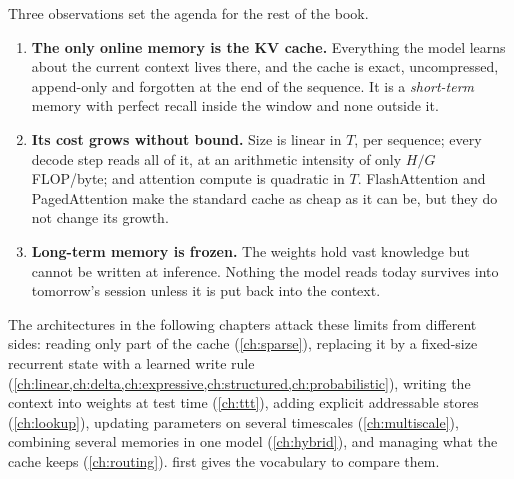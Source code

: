Three observations set the agenda for the rest of the book.
\begin{enumerate}
  \item \textbf{The only online memory is the KV cache.} Everything the model learns about
  the current context lives there, and the cache is exact, uncompressed, append-only and
  forgotten at the end of the sequence. It is a \emph{short-term} memory with perfect recall
  inside the window and none outside it.
  \item \textbf{Its cost grows without bound.} Size is linear in $T$, per sequence; every
  decode step reads all of it, at an arithmetic intensity of only $H/G$ FLOP/byte; and
  attention compute is quadratic in $T$. FlashAttention and PagedAttention make the standard
  cache as cheap as it can be, but they do not change its growth.
  \item \textbf{Long-term memory is frozen.} The weights hold vast knowledge but cannot be
  written at inference. Nothing the model reads today survives into tomorrow's session unless
  it is put back into the context.
\end{enumerate}
The architectures in the following chapters attack these limits from different sides:
reading only part of the cache (\cref{ch:sparse}), replacing it by a fixed-size recurrent
state with a learned write rule (\cref{ch:linear,ch:delta,ch:expressive,ch:structured,ch:probabilistic}),
writing the context into weights at test time (\cref{ch:ttt}), adding explicit addressable
stores (\cref{ch:lookup}), updating parameters on several timescales (\cref{ch:multiscale}),
combining several memories in one model (\cref{ch:hybrid}), and managing what the cache keeps
(\cref{ch:routing}).  first gives the vocabulary to compare them.

